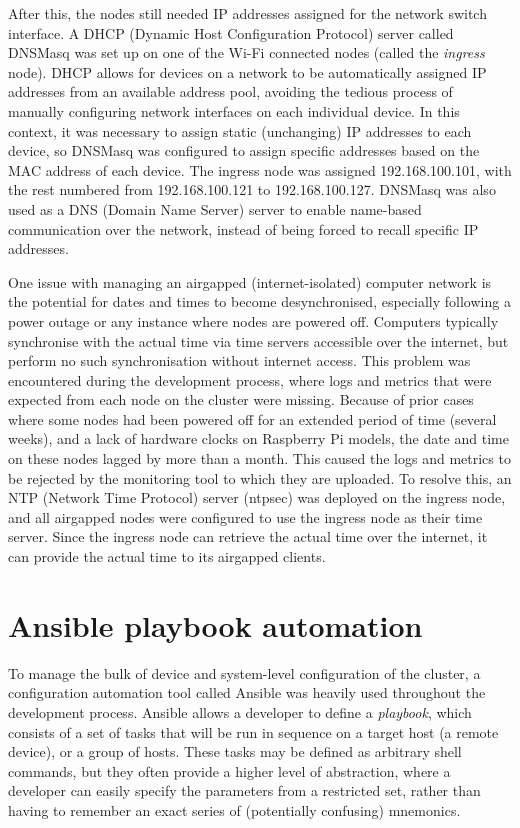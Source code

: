 
After this, the nodes still needed IP addresses assigned for the network switch interface. A DHCP (Dynamic Host Configuration Protocol) server called DNSMasq was set up on one of the Wi-Fi connected nodes (called the \textit{ingress} node). DHCP allows for devices on a network to be automatically assigned IP addresses from an available address pool, avoiding the tedious process of manually configuring network interfaces on each individual device. In this context, it was necessary to assign static (unchanging) IP addresses to each device, so DNSMasq was configured to assign specific addresses based on the MAC address of each device. The ingress node was assigned 192.168.100.101, with the rest numbered from 192.168.100.121 to 192.168.100.127. DNSMasq was also used as a DNS (Domain Name Server) server to enable name-based communication over the network, instead of being forced to recall specific IP addresses.


One issue with managing an airgapped (internet-isolated) computer network is the potential for dates and times to become desynchronised, especially following a power outage or any instance where nodes are powered off. Computers typically synchronise with the actual time via time servers accessible over the internet, but perform no such synchronisation without internet access. This problem was encountered during the development process, where logs and metrics that were expected from each node on the cluster were missing. Because of prior cases where some nodes had been powered off for an extended period of time (several weeks), and a lack of hardware clocks on Raspberry Pi models, the date and time on these nodes lagged by more than a month. This caused the logs and metrics to be rejected by the monitoring tool to which they are uploaded. To resolve this, an NTP (Network Time Protocol) server (ntpsec) was deployed on the ingress node, and all airgapped nodes were configured to use the ingress node as their time server. Since the ingress node can retrieve the actual time over the internet, it can provide the actual time to its airgapped clients.

\section{Ansible playbook automation}

To manage the bulk of device and system-level configuration of the cluster, a configuration automation tool called Ansible was heavily used throughout the development process. Ansible allows a developer to define a \textit{playbook}, which consists of a set of tasks that will be run in sequence on a target host (a remote device), or a group of hosts. These tasks may be defined as arbitrary shell commands, but they often provide a higher level of abstraction, where a developer can easily specify the parameters from a restricted set, rather than having to remember an exact series of (potentially confusing) mnemonics.

